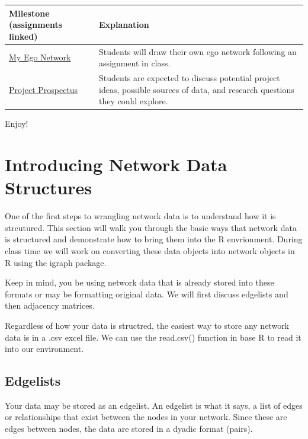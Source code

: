 \documentclass[
  letterpaper,
  DIV=11,
  numbers=noendperiod]{scrreprt}
\begin{document}
\begin{longtable}[]{@{}
  >{\raggedright\arraybackslash}p{}
  >{\raggedright\arraybackslash}p{}@{}}
\toprule\noalign{}
\begin{minipage}[b]{\linewidth}\raggedright
Milestone (assignments linked)
\end{minipage} & \begin{minipage}[b]{\linewidth}\raggedright
Explanation
\end{minipage} \\
\midrule\noalign{}
\endhead
\bottomrule\noalign{}
\endlastfoot
\href{A1_My\%20Ego\%20Network.qmd}{My Ego Network} & Students will draw
their own ego network following an assignment in class. \\
\href{A2_Project\%20Prospectus.qmd}{Project Prospectus} & Students are
expected to discuss potential project ideas, possible sources of data,
and research questions they could explore. \\
\end{longtable}

Enjoy!

\chapter{Introducing Network Data
Structures}\label{introducing-network-data-structures}

One of the first steps to wrangling network data is to understand how it
is strcutured. This section will walk you through the basic ways that
network data is structured and demonstrate how to bring them into the R
envrionment. During class time we will work on converting these data
objects into network objects in R using the igraph package.

Keep in mind, you be using network data that is already stored into
these formats or may be formatting original data. We will first discuss
edgelists and then adjacency matrices.

Regardless of how your data is structred, the easiest way to store any
network data is in a .csv excel file. We can use the read.csv() function
in base R to read it into our environment.

\section{Edgelists}\label{edgelists}

Your data may be stored as an edgelist. An edgelist is what it says, a
list of edges or relationships that exist between the nodes in your
network. Since these are edges between nodes, the data are stored in a
dyadic format (pairs).
\end{document}

